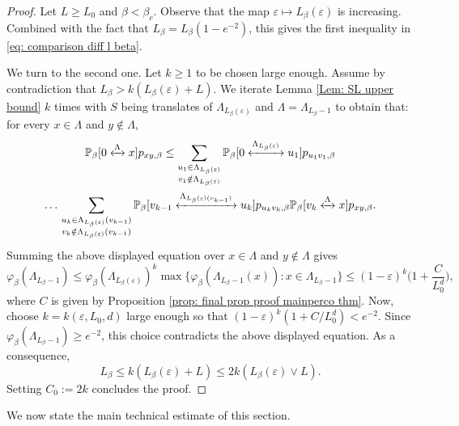 \documentclass[11pt,a4paper]{article}
\numberwithin{equation}{section}
\theoremstyle{plain}
\theoremstyle{definition}
\newcommand{\connect}{\xleftrightarrow}
\begin{document}
\begin{proof} Let $L\geq L_0$ and $\beta<\beta_c$. Observe that the map $\varepsilon\mapsto L_\beta(\varepsilon)$ is increasing. Combined with the fact that $L_\beta=L_\beta(1-e^{-2})$, this gives the first inequality in \eqref{eq: comparison diff l beta}.

We turn to the second one. Let $k\geq 1$ to be chosen large enough. Assume by contradiction that $L_\beta>k(L_\beta(\varepsilon)+L)$. We iterate Lemma \ref{Lem: SL upper bound} $k$ times with $S$ being translates of $\Lambda_{L_\beta(\varepsilon)}$ and $\Lambda=\Lambda_{L_\beta-1}$ to obtain that: for every $x\in \Lambda$ and $y\notin \Lambda$,
\begin{multline}\label{eq:iteration SL}
	\mathbb P_\beta[0\connect{\Lambda\:}x]p_{xy,\beta}\leq \sum_{\substack{u_1\in \Lambda_{L_\beta(\varepsilon)}\\v_1\notin \Lambda_{L_\beta(\varepsilon)}}}\mathbb P_\beta[0\connect{\Lambda_{L_\beta(\varepsilon)}\:}u_1]p_{u_1v_1,\beta}\\\ldots\sum_{\substack{u_k\in \Lambda_{L_\beta(\varepsilon)}(v_{k-1})\\v_k\notin \Lambda_{L_\beta(\varepsilon)}(v_{k-1})}}\mathbb P_\beta[v_{k-1}\connect{\Lambda_{L_\beta(\varepsilon)(v_{k-1})}\:}u_k]p_{u_kv_k,\beta} \mathbb P_\beta[v_k\connect{\Lambda\:}x]p_{xy,\beta}.
	\end{multline}
Summing the above displayed equation over $x\in \Lambda$ and $y\notin \Lambda$ gives
\begin{equation}
\varphi_\beta(\Lambda_{L_\beta-1})\le \varphi_\beta(\Lambda_{L_\beta(\varepsilon)})^k\max\{\varphi_\beta(\Lambda_{L_\beta-1}(x)):x\in \Lambda_{L_\beta-1}\}\le (1-\varepsilon)^k\Big(1+\frac{C}{L_0^d}\Big),
\end{equation}
where $C$ is given by Proposition \ref{prop: final prop proof mainperco thm}. Now, choose $k=k(\varepsilon,L_0,d)$ large enough so that $(1-\varepsilon)^k(1+C/L_0^d)<e^{-2}$. Since $\varphi_\beta(\Lambda_{L_\beta-1})\geq e^{-2}$, this choice contradicts the above displayed equation. As a consequence,
\begin{equation}
	L_\beta\leq k(L_\beta(\varepsilon)+L)\leq 2k(L_\beta(\varepsilon)\vee L).
\end{equation}
Setting $C_0:=2k$ concludes the proof.
\end{proof}

We now state the main technical estimate of this section.
\end{document}
